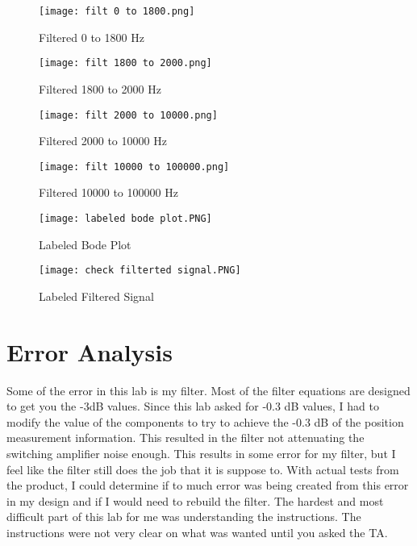 \documentclass[11pt,a4]{report}
\begin{document}
\newpage

\begin{figure}[h!]
    \begin{center}
  \caption{Filtered 0 to 1800 Hz}
  \texttt{[image: filt 0 to 1800.png]}
\end{center}
\end{figure}

\begin{figure}[h!]
    \begin{center}
  \caption{Filtered 1800 to 2000 Hz}
  \texttt{[image: filt 1800 to 2000.png]}
\end{center}
\end{figure}
\newpage

\begin{figure}[h!]
    \begin{center}
  \caption{Filtered 2000 to 10000 Hz}
  \texttt{[image: filt 2000 to 10000.png]}
\end{center}
\end{figure}

\begin{figure}[h!]
    \begin{center}
  \caption{Filtered 10000 to 100000 Hz}
  \texttt{[image: filt 10000 to 100000.png]}
\end{center}
\end{figure}

\begin{figure}[h!]
    \begin{center}
  \caption{Labeled Bode Plot}
  \texttt{[image: labeled bode plot.PNG]}
\end{center}
\end{figure}

\begin{figure}[h!]
    \begin{center}
  \caption{Labeled Filtered Signal}
  \texttt{[image: check filterted signal.PNG]}
\end{center}
\end{figure}

\newpage

\section{Error Analysis}
Some of the error in this lab is my filter. Most of the filter equations are designed to get you the -3dB values. Since this lab asked for -0.3 dB values, I had to modify the value of the components to try to achieve the -0.3 dB of the position measurement information. This resulted in the filter not attenuating the switching amplifier noise enough. This results in some error for my filter, but I feel like the filter still does the job that it is suppose to. With actual tests from the product, I could determine if to much error was being created from this error in my design and if I would need to rebuild the filter. The hardest and most difficult part of this lab for me was understanding the instructions. The instructions were not very clear on what was wanted until you asked the TA. 
\end{document}
